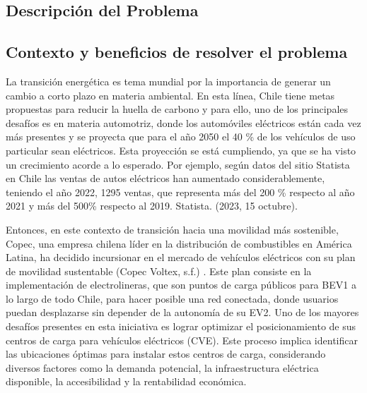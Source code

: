 \documentclass[letterpaper]{article}
\begin{document}
	\newpage
	\begin{flushleft}
		
		\section{Descripción del Problema}
		\subsection{Contexto y beneficios de resolver el problema}
		La transición energética es tema mundial por la importancia de generar un cambio a corto plazo en materia ambiental. En esta línea, Chile tiene metas propuestas para reducir la huella de carbono y para ello, uno de los principales desafíos es en materia automotriz, donde los automóviles eléctricos están cada vez más presentes y se proyecta que para el año 2050 el 40 \% de los vehículos de uso particular sean eléctricos. \cite{Gobierno 1}
		Esta proyección se está cumpliendo, ya que se ha visto un crecimiento acorde a lo esperado. Por ejemplo, según datos del sitio Statista en Chile las ventas de autos eléctricos han aumentado considerablemente, teniendo el año 2022, 1295 ventas, que representa más del 200 \% respecto al año 2021 y más del 500\% respecto al 2019. Statista. (2023, 15 octubre). \cite{Gobierno 2}


		Entonces, en este contexto de transición hacia una movilidad más sostenible, Copec, una empresa chilena líder en la distribución de combustibles en América Latina, ha decidido incursionar en el mercado de vehículos eléctricos con su plan de movilidad sustentable (Copec Voltex, s.f.) \cite{copec}. Este plan consiste en la implementación de electrolineras, que son puntos de carga públicos para BEV1 a lo largo de todo Chile, para hacer posible una red conectada, donde usuarios puedan desplazarse sin depender de la autonomía de su EV2. 
		Uno de los mayores desafíos presentes en esta iniciativa es lograr optimizar el posicionamiento de sus centros de carga para vehículos eléctricos (CVE). Este proceso implica identificar las ubicaciones óptimas para instalar estos centros de carga, considerando diversos factores como la demanda potencial, la infraestructura eléctrica disponible, la accesibilidad y la rentabilidad económica.


\end{flushleft}
\end{document}
